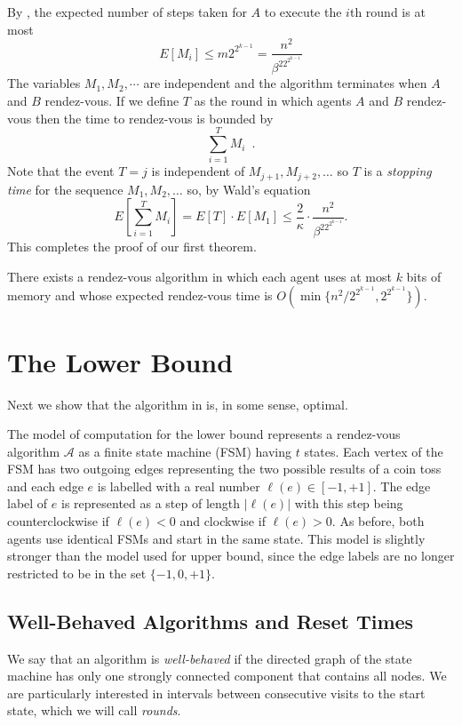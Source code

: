 \documentclass[lotsofwhite]{patmorin}
\newcommand{\A}{\mathcal{A}}
\begin{document}
By , the expected number of steps taken for $A$ to
execute the $i$th round is at most
\[
    E[M_i] \le m 2^{2^{k-1}} = \frac{n^2}{\beta^22^{2^{k-1}}}
\]
The variables $M_1,M_2,\cdots$ are independent and the algorithm
terminates when $A$ and $B$ rendez-vous.  If we define $T$ as
the round in which agents $A$ and $B$ rendez-vous then the time to
rendez-vous is bounded by
\[
   \sum_{i=1}^T M_i \enspace .
\]
Note that the event $T=j$ is independent of $M_{j+1},M_{j+2},\ldots$
so $T$ is a \emph{stopping time} \cite{mXX} for the sequence
$M_1,M_2,\ldots$ so, by Wald's equation
\[
   E\left[\sum_{i=1}^T M_i\right] = E[T]\cdot E[M_1] \le
\frac{2}{\kappa}\cdot \frac{n^2}{\beta^22^{2^{k-1}}}.
\]
This completes the proof of our first theorem.
\begin{thm}
There exists a rendez-vous algorithm in which each agent uses at most
$k$ bits of memory and whose expected rendez-vous time is
$O(\min\{n^2/2^{2^{k-1}},2^{2^{k-1}}\})$.
\end{thm}

\section{The Lower Bound}

Next we show that the algorithm in  is, in some
sense, optimal.

The model of computation for the lower bound represents a rendez-vous
algorithm $\A$ as a finite state machine (FSM) having $t$ states. Each
vertex of the FSM has two outgoing edges representing the two possible
results of a coin toss and each edge $e$ is labelled with a real
number $\ell(e)\in[-1,+1]$.  The edge label of $e$ is represented as a
step of length $|\ell(e)|$ with this step being counterclockwise if
$\ell(e)<0$ and clockwise if $\ell(e)>0$.  As before, both agents use
identical FSMs and start in the same state. This model is slightly
stronger than the model used for upper bound, since the edge labels
are no longer restricted to be in the set $\{-1,0,+1\}$.

\subsection{Well-Behaved Algorithms and Reset Times}

We say that an algorithm is \emph{well-behaved} if the directed graph
of the state machine has only one strongly connected component that
contains all nodes.  We are particularly interested in intervals
between consecutive visits to the start state, which we will call
\emph{rounds}.
\end{document}
